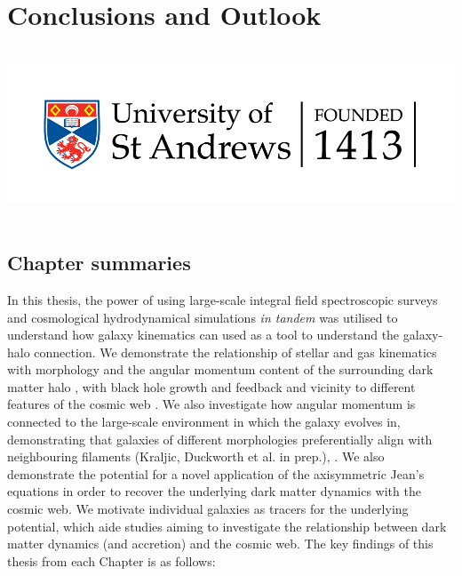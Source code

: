 \chapter{Conclusions and Outlook}
\vspace{-5in}
\includegraphics[height=2.0in]{thesis/latex/st_a_logo_.png}
\vspace{3in}

\section{Chapter summaries}
In this thesis, the power of using large-scale integral field spectroscopic surveys and cosmological hydrodynamical simulations \textit{in tandem} was utilised to understand how galaxy kinematics can used as a tool to understand the galaxy-halo connection. We demonstrate the relationship of stellar and gas kinematics with morphology and the angular momentum content of the surrounding dark matter halo \citep{duckworth2020a}, with black hole growth and feedback \citep{duckworth2020b} and vicinity to different features of the cosmic web \citep{duckworth2019}. We also investigate how angular momentum is connected to the large-scale environment in which the galaxy evolves in, demonstrating that galaxies of different morphologies preferentially align with neighbouring filaments (Kraljic, Duckworth et al. in prep.), . We also demonstrate the potential for a novel application of the axisymmetric Jean's equations in order to recover the underlying dark matter dynamics with the cosmic web. We motivate individual galaxies as tracers for the underlying potential, which aide studies aiming to investigate the relationship between dark matter dynamics (and accretion) and the cosmic web. The key findings of this thesis from each Chapter is as follows:

